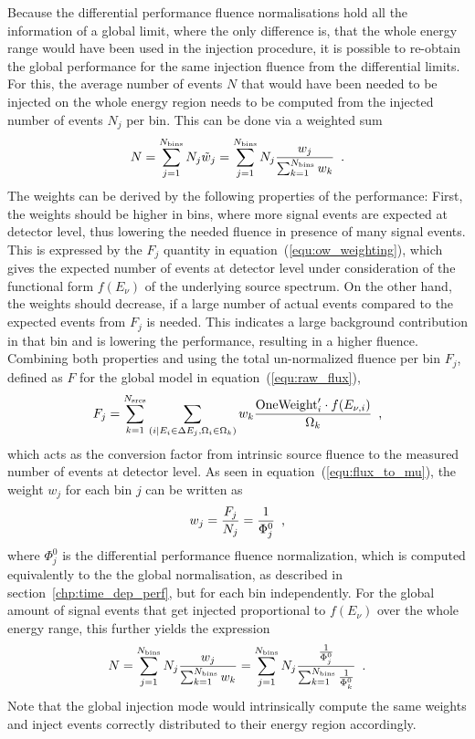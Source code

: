 Because the differential performance fluence normalisations hold all the information of a global limit, where the only difference is, that the whole energy range would have been used in the injection procedure, it is possible to re-obtain the global performance for the same injection fluence from the differential limits.
For this, the average number of events $N$ that would have been needed to be injected on the whole energy region needs to be computed from the injected number of events $N_j$ per bin.
This can be done via a weighted sum
\begin{equation}
  N = \sum_{j=1}^{N_\text{bins}} N_j \tilde{w}_j
    = \sum_{j=1}^{N_\text{bins}}
        N_j \frac{w_j}{\sum_{k=1}^{N_\text{bins}} w_k}
  \enspace\text{.}
\end{equation}
The weights can be derived by the following properties of the performance:
First, the weights should be higher in bins, where more signal events are expected at detector level, thus lowering the needed fluence in presence of many signal events.
This is expressed by the $F_j$ quantity in equation~(\ref{equ:ow_weighting}), which gives the expected number of events at detector level under consideration of the functional form $f(E_\nu)$ of the underlying source spectrum.
On the other hand, the weights should decrease, if a large number of actual events compared to the expected events from $F_j$ is needed.
This indicates a large background contribution in that bin and is lowering the performance, resulting in a higher fluence.
Combining both properties and using the total un-normalized fluence per bin $F_j$, defined as $F$ for the global model in equation~(\ref{equ:raw_flux}),
\begin{equation}
  \label{equ:ow_weighting}
  F_j = \sum_{k=1}^{N_\text{srcs}}
          \sum_{(i|E_i\in\Delta E_j, \Omega_i \in \Omega_k)}
            w_k\frac{\text{OneWeight}'_i\cdot f(E_{\nu,i})}{\Omega_k}
  \enspace\text{,}
\end{equation}
which acts as the conversion factor from intrinsic source fluence to the measured number of events at detector level.
As seen in equation~(\ref{equ:flux_to_mu}), the weight $w_j$ for each bin $j$ can be written as
\begin{equation}
  \label{equ:phi_rawflux_nevts}
  w_j = \frac{F_j}{N_j} = \frac{1}{\Phi_j^0}
  \enspace\text{,}
\end{equation}
where $\Phi_j^0$ is the differential performance fluence normalization, which is computed equivalently to the the global normalisation, as described in section~\ref{chp:time_dep_perf}, but for each bin independently.
For the global amount of signal events that get injected proportional to $f(E_\nu)$ over the whole energy range, this further yields the expression
\begin{equation}
  \label{equ:n_global_from_n_diff}
  N = \sum_{j=1}^{N_\text{bins}} N_j \frac{w_j}{\sum_{k=1}^{N_\text{bins}} w_k}
    = \sum_{j=1}^{N_\text{bins}} N_j
      \frac{\frac{1}{\Phi_j^0}}{\sum_{k=1}^{N_\text{bins}} \frac{1}{\Phi_k^0}}
  \enspace\text{.}
\end{equation}
Note that the global injection mode would intrinsically compute the same weights and inject events correctly distributed to their energy region accordingly.

